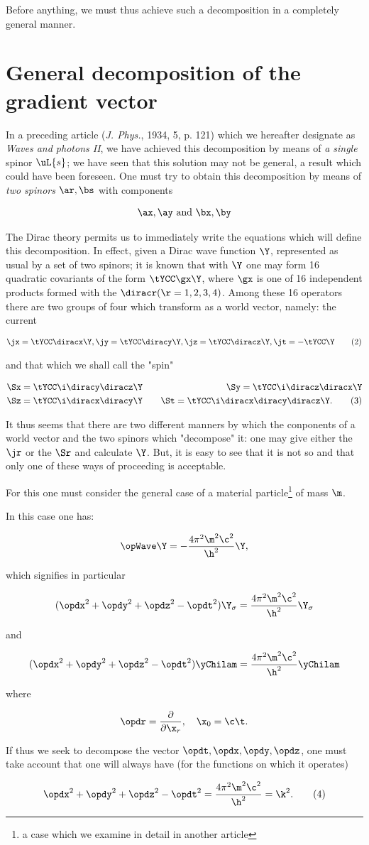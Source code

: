 \documentclass{article}
\newcommand{\nequ}[2]{
\begin{align*}
#1
\tag{#2}
\end{align*}
}
\newcommand{\uequ}[1]{
\begin{align*}
#1
\end{align*}
}
\newcommand{\oppddX}[1]{
\frac{\partial}{\partial{#1}}
}
\renewcommand{\it}[1]{\textit{#1}}
\begin{document}
\begin{multicols}{2}
Before anything, we must thus achieve such a decomposition in a completely general manner.

\section{General decomposition of the gradient vector}
In a preceding article (\it{J. Phys.}, 1934, 5, p. 121) which we hereafter designate as \it{Waves and photons II}, we have achieved this decomposition by means of \it{a single} spinor $\uL{s}$; we have seen that this solution may not be general, a result which could have been foreseen. One must try to obtain this decomposition by means of \it{two spinors} $\ar, \bs$ with components
\uequ{
\ax,\ay \text{ and } \bx, \by
}

The Dirac theory permits us to immediately write the equations which will define this decomposition. In effect, given a Dirac wave function $\Y$, represented as usual by a set of two spinors; it is known that with $\Y$ one may form 16 quadratic covariants of the form $\tYCC\gx\Y$, where $\gx$ is one of 16 independent products formed with the $\diracr (\r=1,2, 3, 4)$. Among these 16 operators there are two groups of four which transform as a world vector, namely: the current
\nequ{
\jx= \tYCC\diracx\Y, \jy = \tYCC\diracy\Y, \jz = \tYCC\diracz\Y, \jt = -\tYCC\Y
}{2}
and that which we shall call the "spin"
\nequ{
&\Sx = \tYCC\i\diracy\diracz\Y \quad &\Sy = \tYCC\i\diracz\diracx\Y \\
&\Sz = \tYCC\i\diracx\diracy\Y \quad &\St = \tYCC\i\diracx\diracy\diracz\Y.
}{3}

It thus seems that there are two different manners by which the conponents of a world vector and the two spinors which "decompose" it: one may give either the $\jr$ or the $\Sr$ and calculate $\Y$. But, it is easy to see that it is not so and that only one of these ways of proceeding is acceptable.

For this one must consider the general case of a material particle\footnote{a case which we examine in detail in another article} of mass $\m$.

In this case one has:
\uequ{
\opWave\Y = -\frac{4\pi^2\m^2\c^2}{\h^2}\Y,
}
which signifies in particular
\uequ{
(\opdx^2 + \opdy^2 + \opdz^2 - \opdt^2)\Y_{\sigma} = 
\frac{4\pi^2\m^2\c^2}{\h^2}\Y_{\sigma}
}
and
\uequ{
(\opdx^2 + \opdy^2 + \opdz^2 - \opdt^2)\yChilam = 
\frac{4\pi^2\m^2\c^2}{\h^2}\yChilam
}
where
\uequ{
\opdr = \oppddX{\x_r}, \quad \x_0 = \c\t.
}

If thus we seek to decompose the vector $\opdt,\opdx,\opdy,\opdz$, one must take account that one will always have (for the functions on which it operates)
\nequ{
\opdx^2 + \opdy^2 + \opdz^2 - \opdt^2 =
\frac{4\pi^2\m^2\c^2}{\h^2} = \k^2.
}{4}


\end{multicols}
\end{document}
